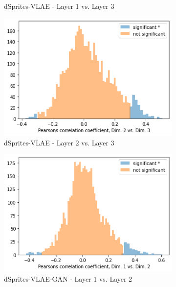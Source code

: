 \begin{figure}
\begin{subfigure}{.3\textwidth}
        \caption{dSprites-\ac{VLAE} - Layer 1 vs. Layer 3}
    \end{subfigure}
    \hfill
    \begin{subfigure}{.3\textwidth}
        \includegraphics[width=\textwidth]{images/notprop/dsprites/vlae/dim_2_3.png}
        \caption{dSprites-\ac{VLAE} - Layer 2 vs. Layer 3}
    \end{subfigure}
    \begin{subfigure}{.3\textwidth}
        \includegraphics[width=\textwidth]{images/notprop/dsprites/vlae_gan/dim_1_2.png}
        \caption{dSprites-\ac{VLAE}-\ac{GAN} - Layer 1 vs. Layer 2}
    \end{subfigure}
    \hfill
    \begin{subfigure}{.3\textwidth}

\end{subfigure}
\end{figure}
